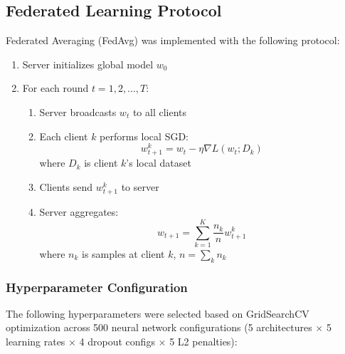 \documentclass[conference]{IEEEtran}
\begin{document}
\subsection{Federated Learning Protocol}

Federated Averaging (FedAvg) \cite{mcmahan2017communication} was implemented with the following protocol:

\begin{enumerate}
    \item Server initializes global model $w_0$
    \item For each round $t = 1, 2, ..., T$:
    \begin{enumerate}
        \item Server broadcasts $w_t$ to all clients
        \item Each client $k$ performs local SGD:
        \begin{equation}
            w_{t+1}^k = w_t - \eta \nabla L(w_t; D_k)
        \end{equation}
        where $D_k$ is client $k$'s local dataset
        \item Clients send $w_{t+1}^k$ to server
        \item Server aggregates:
        \begin{equation}
            w_{t+1} = \sum_{k=1}^{K} \frac{n_k}{n} w_{t+1}^k
        \end{equation}
        where $n_k$ is samples at client $k$, $n = \sum_k n_k$
    \end{enumerate}
\end{enumerate}

\subsubsection{Hyperparameter Configuration}

The following hyperparameters were selected based on GridSearchCV optimization across 500 neural network configurations (5 architectures $\times$ 5 learning rates $\times$ 4 dropout configs $\times$ 5 L2 penalties):
\end{document}
